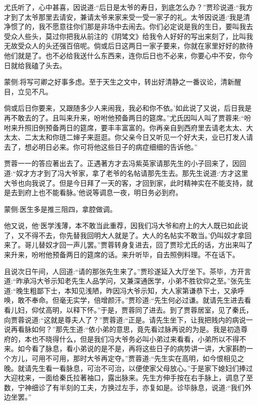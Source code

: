 \begin{parag}
    尤氏听了，心中甚喜，因说道:“后日是太爷的寿日，到底怎么办？”贾珍说道:“我方才到了太爷那里去请安，兼请太爷来家来受一受一家子的礼。太爷因说道:‘我是清净惯了的，我不愿意往你们那是非场中去闹去。你们必定说是我的生日，要叫我去受众人些头，莫过你把我从前注的《阴骘文》给我令人好好的写出来刻了，比叫我无故受众人的头还强百倍呢。倘或后日这两日一家子要来，你就在家里好好的款待他们就是了。也不必给我送什么东西来，连你后日也不必来，你要心中不安，你今日就给我磕了头去。\begin{note}蒙侧:将写可卿之好事多虑。至于天生之文中，转出好清静之一番议论，清新醒目，立见不凡。\end{note}倘或后日你要来，又跟随多少人来闹我，我必和你不依。’如此说了又说，后日我是再不敢去的了。且叫来升来，吩咐他预备两日的筵席。”尤氏因叫人叫了贾蓉来:“吩咐来升照旧例预备两日的筵席，要丰丰富富的。你再亲自到西府里去请老太太、大太太、二太太和你琏二婶子来逛逛。你父亲今日又听见一个好大夫，业已打发人请去了，想必明日必来。你可将他这些日子的病症细细的告诉他。”
\end{parag}


\begin{parag}
    贾蓉一一的答应著出去了。正遇著方才去冯紫英家请那先生的小子回来了，因回道:“奴才方才到了冯大爷家，拿了老爷的名帖请那先生去。那先生说道:‘方才这里大爷也向我说了。但是今日拜了一天的客，才回到家，此时精神实在不能支持，就是去到府上也不能看脉。’他说等调息一夜，明日务必到府。\begin{note}蒙侧:医生多是推三阻四，拿腔做调。\end{note}他又说，他‘医学浅薄，本不敢当此重荐，因我们冯大爷和府上的大人既已如此说了，又不得不去，你先替我回明大人就是了。大人的名帖实不敢当。’仍叫奴才拿回来了。哥儿替奴才回一声儿罢。”贾蓉转身复进去，回了贾珍尤氏的话，方出来叫了来升来，吩咐他预备两日的筵席的话。来升听毕，自去照例料理。不在话下。
\end{parag}


\begin{parag}
    且说次日午间，人回道:“请的那张先生来了。”贾珍遂延入大厅坐下。茶毕，方开言道:“昨承冯大爷示知老先生人品学问，又兼深通医学，小弟不胜钦仰之至。”张先生道:“晚生粗鄙下士，本知见浅陋，昨因冯大爷示知，大人家第谦恭下士，又承呼唤，敢不奉命。但毫无实学，倍增颜汗。”贾珍道:“先生何必过谦。就请先生进去看看儿妇，仰仗高明，以释下怀。”于是，贾蓉同了进去。到了贾蓉居室，见了秦氏，向贾蓉说道:“这就是尊夫人了？”贾蓉道:“正是。请先生坐下，让我把贱内的病说一说再看脉如何？”那先生道:“依小弟的意思，竟先看过脉再说的为是。我是初造尊府的，本也不晓得什么，但是我们冯大爷务必叫小弟过来看看，小弟所以不得不来。如今看了脉息，看小弟说的是不是，再将这些日子的病势讲一讲，大家斟酌一个方儿，可用不可用，那时大爷再定夺。”贾蓉道:“先生实在高明，如今恨相见之晚。就请先生看一看脉息，可治不可治，以便使家父母放心。”于是家下媳妇们捧过大迎枕来，一面给秦氏拉著袖口，露出脉来。先生方伸手按在右手脉上，调息了至数，宁神细诊了有半刻的工夫，方换过左手，亦复如是。诊毕脉息，说道:“我们外边坐罢。”
\end{parag}


